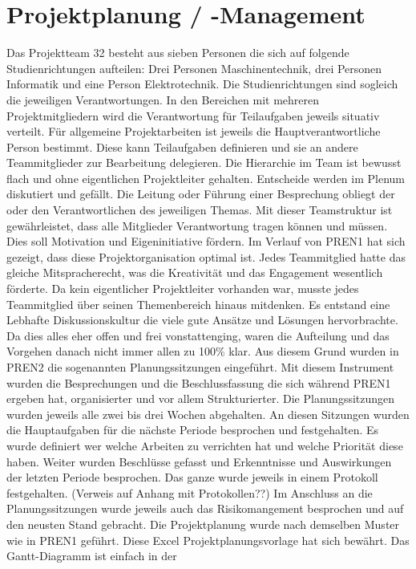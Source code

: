 \section{Projektplanung / -Management}

Das Projektteam 32 besteht aus sieben Personen die sich auf folgende 
Studienrichtungen aufteilen: Drei Personen Maschinentechnik, drei 
Personen Informatik und eine Person Elektrotechnik. Die Studienrichtungen 
sind sogleich die jeweiligen Verantwortungen. In den Bereichen mit mehreren Projektmitgliedern wird die Verantwortung für Teilaufgaben jeweils 
situativ verteilt. Für allgemeine Projektarbeiten ist jeweils die 
Hauptverantwortliche Person bestimmt. Diese kann Teilaufgaben definieren 
und sie an andere Teammitglieder zur Bearbeitung delegieren. Die Hierarchie 
im Team ist bewusst flach und ohne eigentlichen Projektleiter gehalten. 
Entscheide werden im Plenum diskutiert und gefällt. Die Leitung oder Führung 
einer Besprechung obliegt der oder den Verantwortlichen des jeweiligen Themas. 
Mit dieser Teamstruktur ist gewährleistet, dass alle Mitglieder Verantwortung 
tragen können und müssen. Dies soll Motivation und Eigeninitiative fördern. 
Im Verlauf von PREN1 hat sich gezeigt, dass diese Projektorganisation optimal 
ist. Jedes Teammitglied hatte das gleiche Mitspracherecht, was die Kreativität 
und das Engagement wesentlich förderte. Da kein eigentlicher Projektleiter 
vorhanden war, musste jedes Teammitglied über seinen Themenbereich hinaus 
mitdenken. Es entstand eine Lebhafte Diskussionskultur die viele gute Ansätze 
und Lösungen hervorbrachte. Da dies alles eher offen und frei vonstattenging, 
waren die Aufteilung und das Vorgehen danach nicht immer allen zu 100\% klar. 
Aus diesem Grund wurden in PREN2 die sogenannten Planungssitzungen eingeführt. 
Mit diesem Instrument wurden die Besprechungen und die Beschlussfassung die 
sich während PREN1 ergeben hat, organisierter und vor allem Strukturierter. Die 
Planungssitzungen wurden jeweils alle zwei bis drei Wochen abgehalten. An diesen 
Sitzungen wurden die Hauptaufgaben für die nächste Periode besprochen und 
festgehalten. Es wurde definiert wer welche Arbeiten zu verrichten hat und welche 
Priorität diese haben. Weiter wurden Beschlüsse gefasst und Erkenntnisse und 
Auswirkungen der letzten Periode besprochen. Das ganze wurde jeweils in einem 
Protokoll festgehalten. (Verweis auf Anhang mit Protokollen??) Im Anschluss an die Planungssitzungen wurde jeweils auch das Risikomangement besprochen und auf den 
neusten Stand gebracht. 
Die Projektplanung wurde nach demselben Muster wie in PREN1 geführt. Diese Excel Projektplanungsvorlage hat sich bewährt. Das Gantt-Diagramm ist einfach in der 
